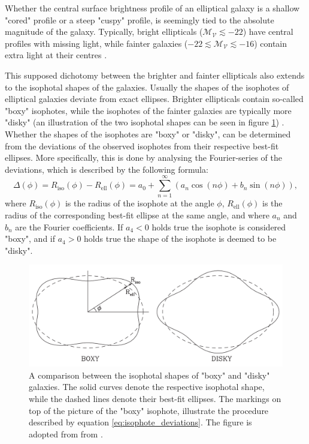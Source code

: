 \documentclass[english, twoside]{HYgradu}
\begin{document}
Whether the central surface brightness profile of an elliptical galaxy is a shallow "cored" profile or a steep "cuspy" profile, is seemingly tied to the absolute magnitude of the galaxy. Typically, bright ellipticals ($\mathcal{M_V} \lesssim -22$) have central profiles with missing light, while fainter galaxies ($-22 \lesssim \mathcal{M_V} \lesssim -16$) contain extra light at their centres \citep{Kormendy2009}. 

This supposed dichotomy between the brighter and fainter ellipticals also extends to the isophotal shapes of the galaxies. Usually the shapes of the isophotes of elliptical galaxies deviate from exact ellipses. Brighter ellipticals contain so-called "boxy" isophotes, while the isophotes of the fainter galaxies are typically more "disky" (an illustration of the two isophotal shapes can be seen in figure \ref{figure:isophotes}) \citep{GalaxyFormationAndEvo2010}. Whether the shapes of the isophotes are "boxy" or "disky", can be determined from the deviations of the observed isophotes from their respective best-fit ellipses. More specifically, this is done by analysing the Fourier-series of the deviations, which is described by the following formula:
\begin{equation}
\Delta (\phi) = R_\mathrm{iso}(\phi) - R_\mathrm{ell}(\phi) = a_0 + \displaystyle\sum^\infty_{n=1} (a_n \cos(n\phi) + b_n \sin(n\phi)), \label{eq:isophote_deviations}
\end{equation}
where $R_\mathrm{iso}(\phi)$ is the radius of the isophote at the angle $\phi$, $R_\mathrm{ell}(\phi)$ is the radius of the corresponding best-fit ellipse at the same angle, and where $a_n$ and $b_n$ are the Fourier coefficients. If $a_4 < 0$ holds true the isophote is considered "boxy", and if $a_4 > 0$ holds true the shape of the isophote is deemed to be "disky".

\begin{figure}
	\centering
	\includegraphics[width=\textwidth]{boxy_and_disky_GFE.png}
	\caption{A comparison between the isophotal shapes of "boxy" and "disky" galaxies. The solid curves denote the respective isophotal shape, while the dashed lines denote their best-fit ellipses. The markings on top of the picture of the "boxy" isophote, illustrate the procedure described by equation \ref{eq:isophote_deviations}. The figure is adopted from from \cite{GalaxyFormationAndEvo2010}.}
	\label{figure:isophotes}
\end{figure}
\end{document}
